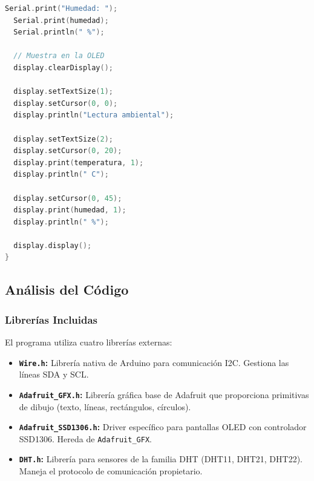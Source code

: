 \documentclass[12pt,a4paper]{article}
\begin{document}
\begin{lstlisting}[language=C++, title=Temperatura\_sin\_termometro.ino]
  Serial.print("Humedad: ");
  Serial.print(humedad);
  Serial.println(" %");

  // Muestra en la OLED
  display.clearDisplay();

  display.setTextSize(1);
  display.setCursor(0, 0);
  display.println("Lectura ambiental");

  display.setTextSize(2);
  display.setCursor(0, 20);
  display.print(temperatura, 1);
  display.println(" C");

  display.setCursor(0, 45);
  display.print(humedad, 1);
  display.println(" %");

  display.display();
}
\end{lstlisting}

\subsection{Análisis del Código}

\subsubsection*{Librerías Incluidas}
El programa utiliza cuatro librerías externas:
\begin{itemize}
    \item \textbf{\texttt{Wire.h}:} Librería nativa de Arduino para comunicación I2C. Gestiona las líneas SDA y SCL.
    \item \textbf{\texttt{Adafruit\_GFX.h}:} Librería gráfica base de Adafruit que proporciona primitivas de dibujo (texto, líneas, rectángulos, círculos).
    \item \textbf{\texttt{Adafruit\_SSD1306.h}:} Driver específico para pantallas OLED con controlador SSD1306. Hereda de \texttt{Adafruit\_GFX}.
    \item \textbf{\texttt{DHT.h}:} Librería para sensores de la familia DHT (DHT11, DHT21, DHT22). Maneja el protocolo de comunicación propietario.
\end{itemize}
\end{document}
